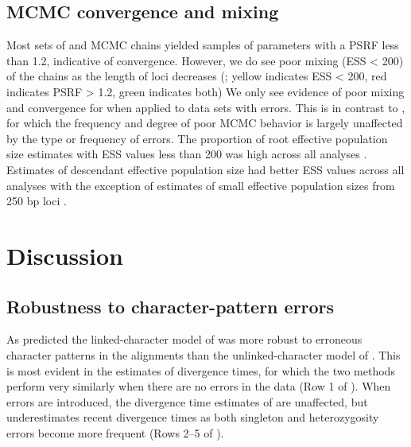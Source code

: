\subsection{MCMC convergence and mixing}
Most sets of \beast and \ecoevolity MCMC chains yielded samples of parameters with
a PSRF less than 1.2, indicative of convergence.
However, we do see poor mixing (ESS < 200) of the \beast chains as the length
of loci decreases (\mainfigs;
yellow indicates ESS < 200, red indicates PSRF > 1.2, green indicates both)
We only see evidence of poor mixing and convergence for \ecoevolity when
applied to data sets with errors.
This is in contrast to \beast, for which the frequency and degree of poor MCMC
behavior is largely unaffected by the type or frequency of errors.
The proportion of \beast root effective population size estimates with ESS 
values less than 200 was high across all analyses \rootfigsp.
Estimates of descendant effective population size had better ESS values across all 
analyses with the exception of estimates of small effective population sizes from 
250 bp loci \thetafigsp.


\section{Discussion}

\subsection{Robustness to character-pattern errors}
As predicted the linked-character model of \beast was more robust to erroneous
character patterns in the alignments than the unlinked-character model of
\ecoevolity.
This is most evident in the estimates of divergence times, for which
the two methods perform very similarly when there are no errors in the
data (Row 1 of \timefigs).
When errors are introduced, the divergence time estimates of \beast are
unaffected, but \ecoevolity underestimates recent divergence times as both
singleton and heterozygosity errors become more frequent (Rows 2--5 of
\timefigs).

